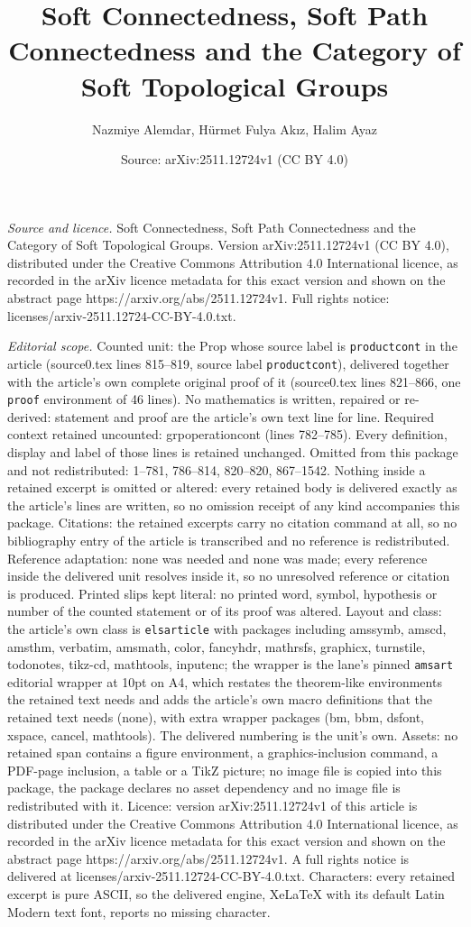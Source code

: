 \documentclass[10pt,a4paper]{amsart}
\title[Soft Connectedness, Soft Path Connectedness and the Category]{Soft Connectedness, Soft Path Connectedness and the Category of Soft Topological Groups}
\author{Nazmiye Alemdar, H\"urmet Fulya Ak{\i}z, Halim Ayaz}
\date{Source: arXiv:2511.12724v1 (CC BY 4.0)}
\begin{document}
\maketitle

\noindent\emph{Source and licence.} Soft Connectedness, Soft Path Connectedness and the Category of Soft Topological Groups. Version arXiv:2511.12724v1 (CC BY 4.0), distributed under the Creative Commons Attribution 4.0 International licence, as recorded in the arXiv licence metadata for this exact version and shown on the abstract page https://arxiv.org/abs/2511.12724v1. Full rights notice: licenses/arxiv-2511.12724-CC-BY-4.0.txt.\par\smallskip

\noindent\textit{Editorial scope.} Counted unit: the Prop whose source label is \texttt{productcont} in the article (source0.tex lines 815--819, source label \texttt{productcont}), delivered together with the article's own complete original proof of it (source0.tex lines 821--866, one \texttt{proof} environment of 46 lines). No mathematics is written, repaired or re-derived: statement and proof are the article's own text line for line. Required context retained uncounted: grpoperationcont (lines 782--785). Every definition, display and label of those lines is retained unchanged. Omitted from this package and not redistributed: 1--781, 786--814, 820--820, 867--1542. Nothing inside a retained excerpt is omitted or altered: every retained body is delivered exactly as the article's lines are written, so no omission receipt of any kind accompanies this package. Citations: the retained excerpts carry no citation command at all, so no bibliography entry of the article is transcribed and no reference is redistributed. Reference adaptation: none was needed and none was made; every reference inside the delivered unit resolves inside it, so no unresolved reference or citation is produced. Printed slips kept literal: no printed word, symbol, hypothesis or number of the counted statement or of its proof was altered. Layout and class: the article's own class is \texttt{elsarticle} with packages including amssymb, amscd, amsthm, verbatim, amsmath, color, fancyhdr, mathrsfs, graphicx, turnstile, todonotes, tikz-cd, mathtools, inputenc; the wrapper is the lane's pinned \texttt{amsart} editorial wrapper at 10pt on A4, which restates the theorem-like environments the retained text needs and adds the article's own macro definitions that the retained text needs (none), with extra wrapper packages (bm, bbm, dsfont, xspace, cancel, mathtools). The delivered numbering is the unit's own. Assets: no retained span contains a figure environment, a graphics-inclusion command, a PDF-page inclusion, a table or a TikZ picture; no image file is copied into this package, the package declares no asset dependency and no image file is redistributed with it. Licence: version arXiv:2511.12724v1 of this article is distributed under the Creative Commons Attribution 4.0 International licence, as recorded in the arXiv licence metadata for this exact version and shown on the abstract page https://arxiv.org/abs/2511.12724v1. A full rights notice is delivered at licenses/arxiv-2511.12724-CC-BY-4.0.txt. Characters: every retained excerpt is pure ASCII, so the delivered engine, XeLaTeX with its default Latin Modern text font, reports no missing character.
\end{document}
